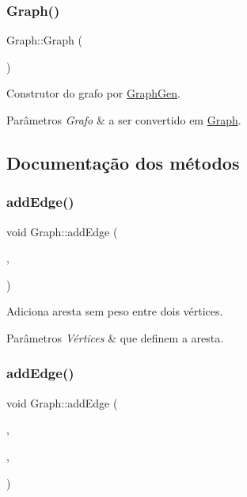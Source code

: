 \subsubsection{\texorpdfstring{Graph()}{Graph()}\hspace{0.1cm}{\footnotesize\ttfamily [3/3]}}
{\footnotesize\ttfamily Graph\+::\+Graph (\begin{DoxyParamCaption}\item[{\mbox{\hyperlink{classGraphGen}{Graph\+Gen}} \&}]{ }\end{DoxyParamCaption})}

Construtor do grafo por \mbox{\hyperlink{classGraphGen}{Graph\+Gen}}. 
\begin{DoxyParams}{Parâmetros}
{\em Grafo} & a ser convertido em \mbox{\hyperlink{classGraph}{Graph}}. \\
\hline
\end{DoxyParams}


\subsection{Documentação dos métodos}
\mbox{\label{classGraph_a9f627b8aaa697daabe0ed31bbd0953eb}} 
\subsubsection{\texorpdfstring{addEdge()}{addEdge()}\hspace{0.1cm}{\footnotesize\ttfamily [1/2]}}
{\footnotesize\ttfamily void Graph\+::add\+Edge (\begin{DoxyParamCaption}\item[{int}]{,  }\item[{int}]{ }\end{DoxyParamCaption})}

Adiciona aresta sem peso entre dois vértices. 
\begin{DoxyParams}{Parâmetros}
{\em Vértices} & que definem a aresta. \\
\hline
\end{DoxyParams}
\mbox{\label{classGraph_ad4155b07ec70e1d85787710452a2bcfa}} 
\subsubsection{\texorpdfstring{addEdge()}{addEdge()}\hspace{0.1cm}{\footnotesize\ttfamily [2/2]}}
{\footnotesize\ttfamily void Graph\+::add\+Edge (\begin{DoxyParamCaption}\item[{int}]{,  }\item[{int}]{,  }\item[{int}]{ }\end{DoxyParamCaption})}

